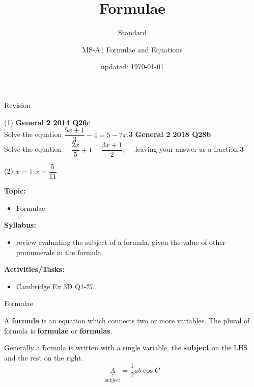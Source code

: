 \documentclass[aspectratio=169,10pt]{beamer}
\title{Formulae}
\subtitle{Standard}
\author{MS-A1 Formulae and Equations}
\date{updated: \today
}
\begin{document}
\begin{frame}{Revision}
\begin{tasks}(1)
    \task \textbf{General 2 2014 Q26c}\\
    Solve the equation $\dfrac{5x+1}{3}-4=5-7x$.\hfill\textbf{3}
    \task \textbf{General 2 2018 Q28b}\\
    Solve the equation $\quad\dfrac{2x}{5}+1=\dfrac{3x+1}{2},\quad$ leaving your answer as a fraction.\hfill\textbf{3}
\end{tasks}\vspace{7pt}\pause
  \begin{solution}[]
    \begin{tasks}(2)
    \task \pause$x=1$
    \task \pause$x=\dfrac{5}{11}$
    \end{tasks}
    \end{solution}
\end{frame}

\frame{\titlepage}

\begin{frame}
  \begin{outcome}
    \textbf{Topic:}
    \begin{itemize}
      \item[] Formulae
    \end{itemize}

    \textbf{Syllabus:}
    \begin{itemize}
      \item review evaluating the subject of a formula, given the value of other pronumerals in the formula
    \end{itemize}

    \textbf{Activities/Tasks:}
    \begin{itemize}
      \item Cambridge Ex 3D Q1-27
    \end{itemize}
  \end{outcome}
\end{frame}

\begin{frame}{Formulae}
  \begin{definition}[]
    A \textbf{formula} is an equation which connects two or more variables. The plural of formula is \textbf{formulae} or \textbf{formulas}.
  \end{definition}\pause
  Generally a formula is written with a single variable, the \textbf{subject} on the LHS and the rest on the right.
  $$\underset{\overset{\uparrow}{\text{subject}}}{A}=\frac{1}{2}ab\cos{C}$$
\end{frame}
\end{document}

